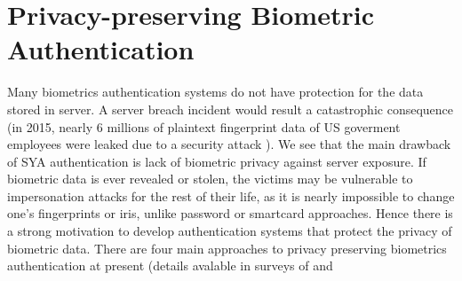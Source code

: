 \section{Privacy-preserving Biometric Authentication}
\label{sec:privacyLiteratures}
Many biometrics authentication systems do not have protection for the data
stored in server. A server breach incident would result a catastrophic
consequence (in 2015, nearly 6 millions of plaintext fingerprint data of US
goverment employees were leaked due to a security attack
\cite{OPMsays563:online}). We see that the main drawback of SYA authentication
is lack of biometric privacy against server exposure. If biometric data is ever
revealed or stolen, the victims may be vulnerable to impersonation attacks for
the rest of their life, as it is nearly impossible to change one’s fingerprints
or iris, unlike password or smartcard approaches. Hence there is a strong
motivation to develop authentication systems that protect the privacy of
biometric data. There are four main approaches to privacy preserving biometrics
authentication at present (details avalable in surveys of \cite{jain201650} and
